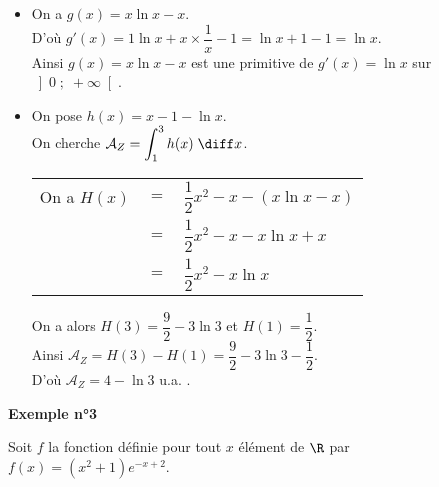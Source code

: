 \begin{itemize}
\begin{itemize}
\item[b)] On a $g(x) = x\ln x - x$. \\

D'où $g'(x) = 1\ln x + x\times \dfrac{1}{x} - 1 = \ln x + 1 - 1 = \ln x$. \\

Ainsi $g(x) = x\ln x - x$ est une primitive de $g'(x) = \ln x$ sur $\left]0 \; ; \; +\infty\right[$. \\

\item[c)] On pose $h(x) = x - 1 - \ln x$. \\

On cherche $\mathcal{A}_Z = \displaystyle{\int_1^3 h(x) \; \diff x}$. \\

\begin{tabular}{lll}
\hspace*{-.3cm} On a $H(x)$& $=$ & $\dfrac{1}{2}x^2 - x - \left(x\ln x - x\right)$ \vspace*{.3cm} \\
& $=$ & $\dfrac{1}{2}x^2 - x - x\ln x + x$ \vspace*{.3cm} \\
& $=$ & $\dfrac{1}{2}x^2 - x\ln x$ \vspace*{.3cm} \\
\end{tabular}

\vspace*{.3cm}

On a alors $H(3) = \dfrac{9}{2} - 3\ln 3$ et $H(1) = \dfrac{1}{2}$. \\

Ainsi $\mathcal{A}_Z = H(3) - H(1) = \dfrac{9}{2} - 3\ln 3 - \dfrac{1}{2}$. \\

D'où $\mathcal{A}_Z = 4 - \ln 3$ u.a. . \\
\end{itemize}
\end{itemize}

\newpage

\vspace*{-1.5cm}

\textbf{Exemple n°3} \\

\vspace*{-.1cm} 

Soit $f$ la fonction définie pour tout $x$ élément de $\R$ par $f(x) = \left(x^2 + 1\right)e^{-x+2}$. \\

